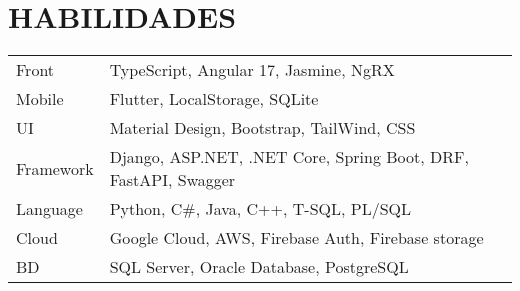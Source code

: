 \documentclass[a4paper,12pt]{article}
\begin{document}
\section{HABILIDADES}
\begin{tabularx}{\linewidth}{@{}l X@{}}
Front &  \normalsize{TypeScript, Angular 17, Jasmine, NgRX}\\
Mobile & \normalsize{Flutter, LocalStorage, SQLite } \\
UI  &  \normalsize{Material Design, Bootstrap, TailWind, CSS}\\  
Framework  &  \normalsize{Django, ASP.NET, .NET Core, Spring Boot, DRF, FastAPI, Swagger}\\
Language  &  \normalsize{Python, C\#, Java, C++, T-SQL, PL/SQL }\\
Cloud  &  \normalsize{Google Cloud, AWS, Firebase Auth, Firebase storage}\\
BD  &  \normalsize{SQL Server, Oracle Database, PostgreSQL }\\
\end{tabularx}



\vfill
{}
\end{document}
